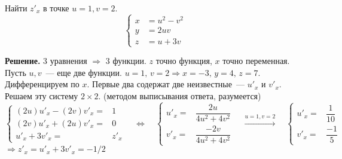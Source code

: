 \begin{Example*}
    Найти $z'_x$ в точке $u=1,v=2$.
    $$\left\{\begin{aligned}
        x&=u^2-v^2\\
        y&=2u v\\
        z&=u+3v
    \end{aligned}\right.$$
    
\end{Example*}
\textbf{Решение.}
    $3$ уравнения $\Rightarrow$ $3$ функции. $z$ точно функция, $x$ точно переменная. Пусть $u,v$~--- еще две функции. $u=1,\,v=2 \Rightarrow x=-3,\,y=4,\,z=7$. Дифференцируем по $x$. Первые два содержат две неизвестные~--- $u'_x$ и $v'_x$. Решаем эту систему $2\times 2$. (методом выписывания ответа, разумеется) $$\left\{\begin{aligned}
        (2u)u'_x-(2v)v'_x =& 1\\
        (2v)u'_x+(2u)v'_x=&0\\
        u'_x+3v'_x=&z'_x
    \end{aligned}\right.\quad \Leftrightarrow\quad
   \left\{\begin{aligned}
        u'_x=&\dfrac{2u}{4u^2+4v^2}\\
        v'_x=&\dfrac{-2v}{4u^2+4v^2}
    \end{aligned}\right.\quad \xrightarrow{u=1,v=2}\quad
    \left\{\begin{aligned}
        u'_x=&\dfrac{1}{10}\\
        v'_x=&\dfrac{-1}{5}
    \end{aligned}\right.$$
    $\Rightarrow z'_x=u'_x+3v'_x=-1/2$
\newpage
